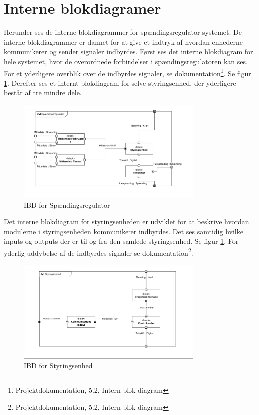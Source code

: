 

\section{Interne blokdiagramer}

Herunder ses de interne blokdiagrammer for spændingsregulator systemet. De interne blokdiagrammer er dannet for at give et indtryk af hvordan enhederne kommunikerer og sender signaler indbyrdes. Først ses det interne blokdiagram for hele systemet, hvor de overordnede forbindelser i spændingsregulatoren kan ses. For et yderligere overblik over de indbyrdes signaler, se dokumentation\footnote{Projektdokumentation, 5.2, Intern blok diagram}. Se figur \ref{fig:IBDSp}. Derefter ses et internt blokdiagram for selve styringsenhed, der yderligere består af tre mindre dele. 

\begin{figure}[htbp] %
	\centering
	\includegraphics[width=0.8\textwidth]{figure/IBDSpaendingsregulator.pdf}
	\caption{IBD for Spændingsregulator}
	\label{fig:IBDSp}
\end{figure}

Det interne blokdiagram for styringsenheden er udviklet for at beskrive hvordan modulerne i styringsenheden kommunikerer indbyrdes. Det ses samtidig hvilke inputs og outputs der er til og fra den samlede styringsenhed. Se figur \ref{fig:IBDSp}. For yderlig uddybelse af de indbyrdes signaler se dokumentation\footnote{Projektdokumentation, 5.2, Intern blok diagram}.


\begin{figure}[htbp] %
	\centering
	\includegraphics[width=0.8\textwidth]{figure/IBDStyringsenhed.pdf}
	\caption{IBD for Styringsenhed}
	\label{fig:IBDSt}
\end{figure}




